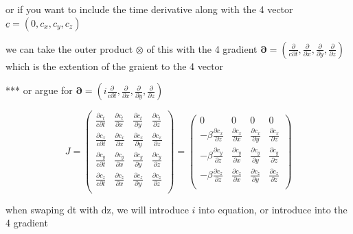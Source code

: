 or if you want to include the time derivative along with the 4 vector $\underline{c}= (0,c_x,c_y,c_z)$

we can take the outer product $\otimes$ of this with the 4 gradient $\boldsymbol{\partial} = \left( \frac{\partial}{c \partial t}, \frac{\partial}{\partial x}, \frac{\partial}{\partial y}, \frac{\partial}{\partial z} \right)$ which is the extention of the graient to the 4 vector

*** or argue for $\boldsymbol{\partial} = \left( i \frac{\partial}{c \partial t}, \frac{\partial}{\partial x}, \frac{\partial}{\partial y}, \frac{\partial}{\partial z} \right)$

\begin{equation}
	J =
	\begin{pmatrix}
		\frac{\partial c_t}{c\partial t} & \frac{\partial c_t}{\partial x} & \frac{\partial c_t}{\partial y} & \frac{\partial c_t}{\partial z}\\
		\frac{\partial c_x}{c \partial t} & \frac{\partial c_x}{\partial x} & \frac{\partial c_x}{\partial y} & \frac{\partial c_x}{\partial z} \\
		\frac{\partial c_y}{c \partial t} & \frac{\partial c_y}{\partial x} & \frac{\partial c_y}{\partial y} & \frac{\partial c_y}{\partial z} \\
		\frac{\partial c_z}{c \partial t} & \frac{\partial c_z}{\partial x} & \frac{\partial c_z}{\partial y} & \frac{\partial c_z}{\partial z} \\
	\end{pmatrix}
	=
	\begin{pmatrix}
		0                                 & 0                               & 0                               & 0                               \\
		-\beta\frac{\partial c_x}{\partial z} & \frac{\partial c_x}{\partial x} & \frac{\partial c_x}{\partial y} & \frac{\partial c_x}{\partial z} \\
		-\beta\frac{\partial c_y}{\partial z} & \frac{\partial c_y}{\partial x} & \frac{\partial c_y}{\partial y} & \frac{\partial c_y}{\partial z} \\
		-\beta\frac{\partial c_z}{\partial z} & \frac{\partial c_z}{\partial x} & \frac{\partial c_z}{\partial y} & \frac{\partial c_z}{\partial z} \\
	\end{pmatrix}
\end{equation}



when swaping dt with dz, we will introduce $i$ into equation, or introduce into the 4 gradient

